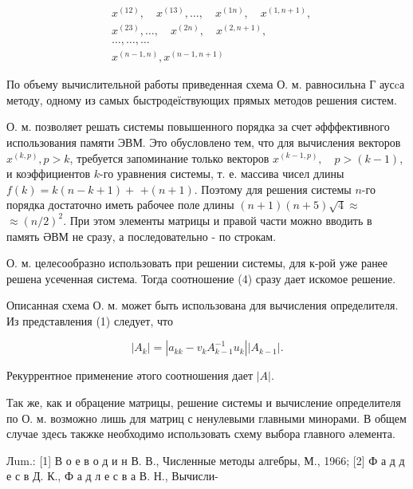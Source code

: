 \documentclass[10pt]{article}
\begin{document}
\[
\begin{aligned}
& x^{(12)}, \quad x^{(13)}, \ldots, \quad x^{(1 n)}, \quad x^{(1, n+1)}, \\
& x^{(23)}, \ldots, \quad x^{(2 n)}, \quad x^{(2, n+1)} \text {, } \\
& \ldots, \ldots, \ldots \\
& x^{(n-1, n)}, x^{(n-1, n+1)}
\end{aligned}
\]

По объему вычислительной работы приведенная схема О. м. равносильна Г аусcа методу, одному из самых быстродеїствующих прямых методов решения систем.

О. м. позволяет решать системы повышенного порядка за счет әфффективного использования памяти ЭВМ. Это обусловлено тем, что для вычисления векторов $x^{(k, p)}, p>k$, требуется запоминание только векторов $x^{(k-1, p)}, \quad p>(k-1)$, и коэффициентов $k$-го уравнения системы, т. е. массива чисел длины $f(k)=k(n-k+1)+$ $+(n+1)$. Поэтому для решения системы $n$-го порядка достаточно иметь рабочее поле длины $(n+1)(n+5) \sqrt{4} \approx$ $\approx(n / 2)^{2}$. При этом элементы матрицы и правой части можно вводить в память ӘВМ не сразу, а последовательно - по строкам.

О. м. целесообразно использовать при решении системы, для к-рой уже ранее решена усеченная система. Тогда соотношение (4) сразу дает искомое решение.

Описанная схема О. м. может быть использована для вычисления определителя. Из представления (1) следует, что

\[
\left|A_{k}\right|=\left|a_{k k}-v_{k} A_{k-1}^{-1} u_{k}\right|\left|A_{k-1}\right| .
\]

Рекуррентное применение әтого соотношения дает $|A|$.

Так же, как и обрацение матрицы, решение системы и вычисление определителя по О. м. возможно лишь для матриц с ненулевыми главными минорами. В общем случае здесь такжке необходимо использовать схему выбора главного әлемента.

Лum.: [1] В о е в о д и н В. В., Численные методы алгебры, М., 1966; [2] Ф а д д е с в Д. К., Ф а д л е с в а В. Н., Вычисли-
\end{document}
